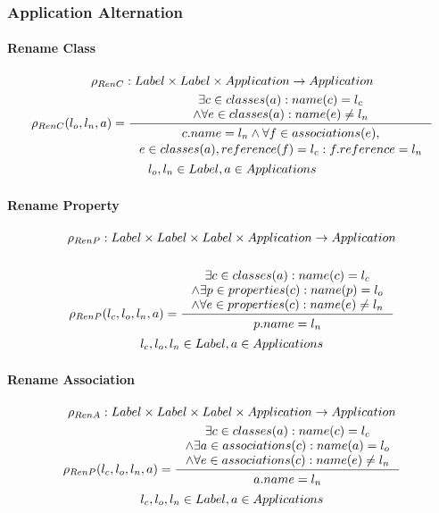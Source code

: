 \documentclass[11pt]{article}
\begin{document}
\subsubsection{Application Alternation}
\paragraph{Rename Class}
\begin{gather*}
\rho_{RenC} : Label \times Label \times Application \rightarrow Application \\ 
\rho_{RenC}(l_o, l_n, a) = \inference{\exists c \in classes(a) : name(c) = l_c \\ \wedge \forall e \in classes(a) : name(e) \neq l_n}{\begin{gathered}
c.name = l_n \wedge \forall f \in associations(e), \\ e \in classes(a), reference(f) = l_c : f.reference = l_n 
\end{gathered}}\\
l_o, l_n \in Label, a \in Applications
\end{gather*}

\paragraph{Rename Property}
\begin{gather*}
\rho_{RenP} : Label \times Label \times Label \times Application \rightarrow Application \\ \\
	\rho_{RenP}(l_c, l_o, l_n, a) = \inference{\exists c \in classes(a) : name(c) = l_c \\ \wedge \exists p \in properties(c) : name(p) = l_o \\ \wedge \forall e \in properties(c) : name(e) \neq l_n}{\begin{gathered}
p.name = l_n 
\end{gathered}}\\
l_c, l_o, l_n \in Label, a \in Applications
\end{gather*}

\paragraph{Rename Association}
\begin{gather*}
\rho_{RenA} : Label \times Label \times Label \times Application \rightarrow Application \\
	\rho_{RenP}(l_c, l_o, l_n, a) = \inference{\exists c \in classes(a) : name(c) = l_c \\ \wedge \exists a \in associations(c) : name(a) = l_o \\ \wedge \forall e \in associations(c) : name(e) \neq l_n}{\begin{gathered}
a.name = l_n 
\end{gathered}}\\
l_c, l_o, l_n \in Label, a \in Applications
\end{gather*}
\end{document}
